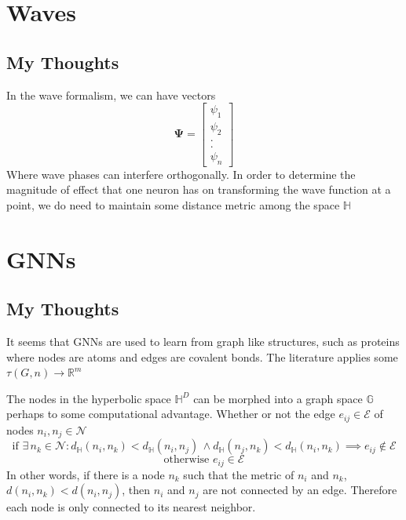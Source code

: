 \documentclass{article}
\begin{document}
\section{Waves}
\subsection{My Thoughts}
In the wave formalism, we can have vectors
\[
\mathbf{\Psi} = \begin{bmatrix}
\psi_1 \\
\psi_2 \\
. \\
. \\ 
\psi_n
\end{bmatrix}
\]
Where wave phases can interfere orthogonally. In order to determine the magnitude of effect that one neuron has on transforming the wave function at a point, we do need to maintain some distance metric among the space $\mathbb{H}$






\section{GNNs}
\subsection{My Thoughts}
It seems that GNNs are used to learn from graph like structures, such as proteins where nodes are atoms and edges are covalent bonds. The literature applies some $\tau(G,n) \to \mathbb{R}^m$

The nodes in the hyperbolic space $\mathbb{H}^D$ can be morphed into a graph space $\mathbb{G}$ perhaps to some computational advantage. Whether or not the edge $e_{ij} \in \mathcal{E}$ of nodes $n_i, n_j \in \mathcal{N}$
\begin{equation}
    \mathrm{if} \,\,\exists \, n_k \in \mathcal{N} : d_\mathbb{H}(n_i,n_k) < d_\mathbb{H}(n_i,n_j) \, \land d_\mathbb{H}(n_j,n_k) < d_\mathbb{H}(n_i,n_k) \implies  e_{ij} \notin \mathcal{E}
\end{equation}
\begin{equation*}
    \mathrm{otherwise} \,\, e_{ij} \in \mathcal{E}
\end{equation*}
In other words, if there is a node $n_k$ such that the metric of $n_i$ and $n_k$, $d(n_i,n_k) < d(n_i,n_j)$, then $n_i$ and $n_j$ are not connected by an edge. Therefore each node is only connected to its nearest neighbor. \\ 
\end{document}
